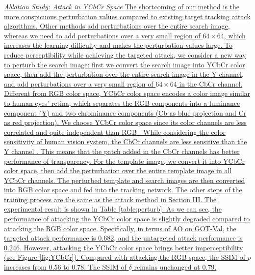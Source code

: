 \documentclass[journal]{IEEEtran}
\begin{document}
\uline{\textit{Ablation Study: Attack in YCbCr Space}
The shortcoming of our method is the more conspicuous perturbation values compared to existing target tracking attack algorithms. Other methods add perturbations over the entire search image, whereas we need to add perturbations over a very small region of $64 \times 64$, which increases the learning difficulty and makes the perturbation values large. To reduce perceptibility while achieving the targeted attack, we consider a new way to perturb the search image: first we convert the search image into YCbCr color space, then add the perturbation over the entire search image in the Y channel, and add perturbations over a very small region of $64 \times 64$ in the CbCr channel. Different from RGB color space, YCbCr color space encodes a color image similar to human eyes’ retina, which separates the RGB components into a luminance component (Y) and two chrominance components (Cb as blue projection and Cr as red projection). We choose YCbCr color space since its color channels are less correlated and quite independent than RGB \cite{8630918}. While considering the color sensitivity of human vision system, the CbCr channels are less sensitive than the Y channel \cite{8630918}. This means that the patch added in the CbCr channels has better performance of transparency.
For the template image, we convert it into YCbCr color space, then add the perturbation over the entire template image in all YCbCr channels. The perturbed template and search images are then converted into RGB color space and fed into the tracking network. The other steps of the training process are the same as the attack method in Section III. The experimental result is shown in Table \ref{table:perturb}. As we can see, the performance of attacking the YCbCr color space is slightly degraded compared to attacking the RGB color space. Specifically, in terms of AO on GOT-Val, the targeted attack performance is 0.682, and the untargeted attack performance is 0.246. However, attacking the YCbCr color space brings better imperceptibility (see Figure \ref{fig:YCbCr}). Compared with attacking the RGB space, the SSIM of $p$ increases from 0.56 to 0.78. The SSIM of $\delta$ remains unchanged at 0.79.
}
\end{document}
